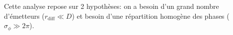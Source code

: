 Cette analyse repose sur 2 hypothèses: on a besoin d'un grand nombre d'émetteurs ($r_{\mathrm{diff}} \ll D$) et besoin d'une répartition homogène des phases ($\sigma_\phi \gg 2\pi$).

